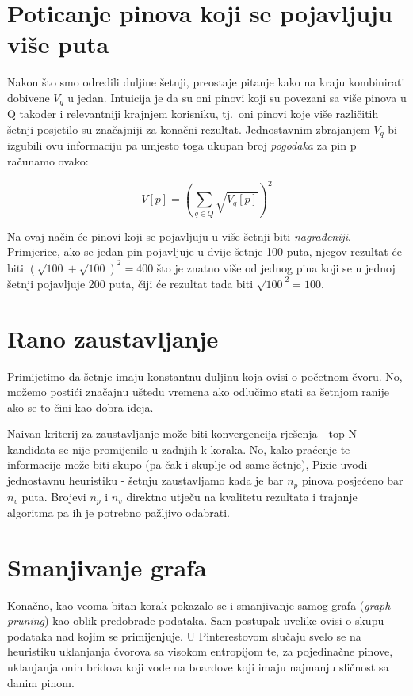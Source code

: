 \documentclass[times, utf8, seminar]{fer}
\begin{document}
\section{Poticanje pinova koji se pojavljuju više puta}

Nakon što smo odredili duljine šetnji, preostaje pitanje kako na kraju kombinirati dobivene $V_q$ u jedan. Intuicija je da su oni pinovi koji su povezani sa više pinova u Q također i relevantniji krajnjem korisniku, tj.\ oni pinovi koje više različitih šetnji posjetilo su značajniji za konačni rezultat. Jednostavnim zbrajanjem $V_q$ bi izgubili ovu informaciju pa umjesto toga ukupan broj \textit{pogodaka} za pin p računamo ovako:

\begin{centering}
		  $$ V[p] = (\sum_{q \in Q}{\sqrt{V_q[p]}})^2 $$
		  \par
\end{centering}

Na ovaj način će pinovi koji se pojavljuju u više šetnji biti \textit{nagrađeniji}. Primjerice, ako se jedan pin pojavljuje u dvije šetnje 100 puta, njegov rezultat će biti $ (\sqrt{100} + \sqrt{100})^2 = 400 $ što je znatno više od jednog pina koji se u jednoj šetnji pojavljuje 200 puta, čiji će rezultat tada biti $ \sqrt{100}^2 = 100 $.

\section{Rano zaustavljanje}

Primijetimo da šetnje imaju konstantnu duljinu koja ovisi o početnom čvoru. No, možemo postići značajnu uštedu vremena ako odlučimo stati sa šetnjom ranije ako se to čini kao dobra ideja.

Naivan kriterij za zaustavljanje može biti konvergencija rješenja - top N kandidata se nije promijenilo u zadnjih k koraka. No, kako praćenje te informacije može biti skupo (pa čak i skuplje od same šetnje), Pixie uvodi jednostavnu heuristiku - šetnju zaustavljamo kada je bar $n_p$ pinova posjećeno bar $n_v$ puta. Brojevi $n_p$ i $n_v$ direktno utječu na kvalitetu rezultata i trajanje algoritma pa ih je potrebno pažljivo odabrati.

\section{Smanjivanje grafa}

Konačno, kao veoma bitan korak pokazalo se i smanjivanje samog grafa (\textit{graph pruning}) kao oblik predobrade podataka. Sam postupak uvelike ovisi o skupu podataka nad kojim se primijenjuje. U Pinterestovom slučaju svelo se na heuristiku uklanjanja čvorova sa visokom entropijom te, za pojedinačne pinove, uklanjanja onih bridova koji vode na boardove koji imaju najmanju sličnost sa danim pinom.
\end{document}

